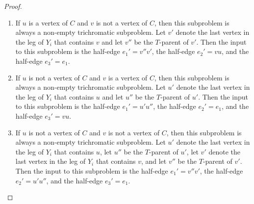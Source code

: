 \documentclass{patmorin}
\begin{document}
\begin{proof}
\begin{enumerate}
  \item If $u$ is a vertex of $C$ and $v$ is not a vertex of $C$, then this subproblem is always a non-empty trichromatic subproblem. Let $v'$ denote the last vertex in the leg of $Y_i$ that contains $v$ and let $v''$ be the $T$-parent of $v'$. Then the input to this subproblem is the half-edge $e_1'=v''v'$, the half-edge $e_2'=vu$, and the half-edge $e_3'=e_1$.


  \item If $u$ is not a vertex of $C$ and $v$ is a vertex of $C$, then this subproblem is always a non-empty trichromatic subproblem. Let $u'$ denote the last vertex in the leg of $Y_i$ that contains $u$ and let $u''$ be the $T$-parent of $u'$. Then the input to this subproblem is the half-edge $e_1'=u'u''$, the half-edge $e_2'=e_1$, and the half-edge $e_3'=vu$.


  \item If $u$ is not a vertex of $C$ and $v$ is not a vertex of $C$, then this subproblem is always a non-empty trichromatic subproblem.  Let $u'$ denote the last vertex in the leg of $Y_i$ that contains $u$, let $u''$ be the $T$-parent of $u'$, let $v'$ denote the last vertex in the leg of $Y_i$ that contains $v$, and let $v''$ be the $T$-parent of $v'$.  Then the input to this subproblem is the half-edge $e_1'=v''v'$, the half-edge $e_2'=u'u''$, and the half-edge $e_3'=e_1$.
  
  
  
  
  

\end{enumerate}
\end{proof}
\end{document}
